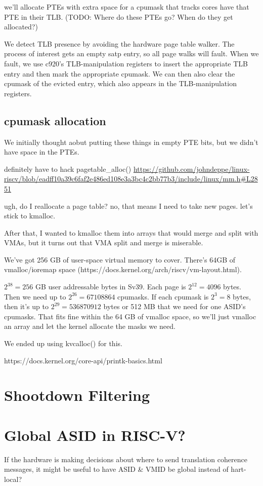 we'll allocate PTEs with extra space for a cpumask that tracks cores have that PTE in their TLB. (TODO: Where do these PTEs go? When do they get allocated?)

We detect TLB presence by avoiding the hardware page table walker. The process of interest gets an empty satp entry, so all page walks will fault. When we fault, we use c920's TLB-manipulation registers to insert the appropriate TLB entry and then mark the appropriate cpumask. We can then also clear the cpumask of the evicted entry, which also appears in the TLB-manipulation registers.

\subsection{cpumask allocation}

We initially thought aobut putting these things in empty PTE bits, but we didn't have space in the PTEs.

definitely have to hack {pagetable\_alloc()} \url{https://github.com/johndeppe/linux-riscv/blob/eadff10a39c6faf2e486ed108e3a3bc4c2bb77b3/include/linux/mm.h#L2851}

ugh, do I reallocate a page table? no, that means I need to take new pages. let's stick to kmalloc.

After that, I wanted to kmalloc them into arrays that would merge and split with VMAs, but it turns out that VMA split and merge is miserable.

We've got 256 GB of user-space virtual memory to cover. There's 64GB of vmalloc/ioremap space (https://docs.kernel.org/arch/riscv/vm-layout.html).

$2^{38} = 256$ GB user addressable bytes in Sv39. Each page is $2^{12} = 4096$ bytes. Then we need up to $2^{26} = 67108864$ cpumasks. If each cpumask is $2^3 = 8$ bytes, then it's up to $2^{29} = 536870912$ bytes or 512 MB that  we need for one ASID's cpumasks. That fits fine within the 64 GB of vmalloc space, so we'll just vmalloc an array and let the kernel allocate the masks we need.

We ended up using kvcalloc() for this.

https://docs.kernel.org/core-api/printk-basics.html

\section{Shootdown Filtering}

\section{Global ASID in RISC-V?}
If the hardware is making decisions about where to send translation coherence messages, it might be useful to have ASID \& VMID be global instead of hart-local?

